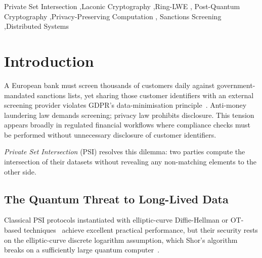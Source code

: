 \documentclass[preprint,12pt]{elsarticle}
\begin{document}
\begin{frontmatter}
\begin{abstract}
To demonstrate the practical relevance of the protocol, we introduce
\textbf{FLARE}, a proof-of-concept sanctions-screening prototype. FLARE
shows that privacy-preserving compliance workflows based on lattice
cryptography can be prototyped on commodity infrastructure for
overnight or batch-processing scenarios.


\end{abstract}

\begin{keyword}
Private Set Intersection \sep Laconic Cryptography \sep Ring-LWE \sep
Post-Quantum Cryptography \sep Privacy-Preserving Computation \sep
Sanctions Screening \sep Distributed Systems
\end{keyword}

\end{frontmatter}

\linenumbers   %

\section{Introduction}
\label{sec:intro}

A European bank must screen thousands of customers daily against
government-mandated sanctions lists, yet sharing those customer identifiers
with an external screening provider violates GDPR's data-minimisation
principle~\cite{gdpr2016}. Anti-money laundering law demands screening; privacy law prohibits
disclosure. This tension appears broadly in regulated financial workflows where
compliance checks must be performed without unnecessary disclosure of customer
identifiers.

\emph{Private Set Intersection} (PSI) resolves this dilemma: two parties
compute the intersection of their datasets without revealing any non-matching
elements to the other side.

\subsection{The Quantum Threat to Long-Lived Data}

Classical PSI protocols instantiated with elliptic-curve Diffie-Hellman or
OT-based techniques~\cite{kolesnikov2016kkrt} achieve excellent practical
performance, but their security rests on the elliptic-curve discrete
logarithm assumption, which Shor's algorithm breaks on a sufficiently large
quantum computer~\cite{shor1994}.
\end{document}
